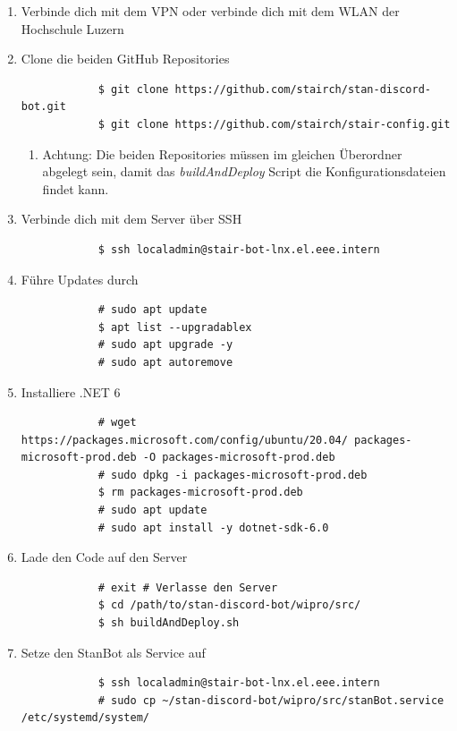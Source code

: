 \documentclass[a4paper, table]{article}
\begin{document}
\begin{enumerate}
    \item Verbinde dich mit dem VPN oder verbinde dich mit dem WLAN der Hochschule Luzern
    \item Clone die beiden GitHub Repositories
        \begin{lstlisting}
            $ git clone https://github.com/stairch/stan-discord-bot.git
            $ git clone https://github.com/stairch/stair-config.git
        \end{lstlisting}
        \begin{enumerate}
            \item Achtung: Die beiden Repositories müssen im gleichen Überordner abgelegt sein, damit das \textit{buildAndDeploy} Script die Konfigurationsdateien findet kann.
        \end{enumerate}
    \item Verbinde dich mit dem Server über SSH
        \begin{lstlisting}
            $ ssh localadmin@stair-bot-lnx.el.eee.intern
        \end{lstlisting}
    \item Führe Updates durch
        \begin{lstlisting}
            # sudo apt update
            $ apt list --upgradablex
            # sudo apt upgrade -y
            # sudo apt autoremove
        \end{lstlisting}
    \item Installiere .NET 6
        \begin{lstlisting}
            # wget https://packages.microsoft.com/config/ubuntu/20.04/ packages-microsoft-prod.deb -O packages-microsoft-prod.deb
            # sudo dpkg -i packages-microsoft-prod.deb
            $ rm packages-microsoft-prod.deb
            # sudo apt update
            # sudo apt install -y dotnet-sdk-6.0
        \end{lstlisting}
    \item Lade den Code auf den Server
        \begin{lstlisting}
            # exit # Verlasse den Server
            $ cd /path/to/stan-discord-bot/wipro/src/
            $ sh buildAndDeploy.sh
        \end{lstlisting}
    \item Setze den StanBot als Service auf
        \begin{lstlisting}
            $ ssh localadmin@stair-bot-lnx.el.eee.intern
            # sudo cp ~/stan-discord-bot/wipro/src/stanBot.service /etc/systemd/system/

\end{lstlisting}
\end{enumerate}
\end{document}
